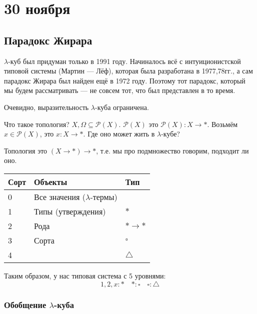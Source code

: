 \chapter{30 ноября}

\section{Парадокс Жирара}

\(\lambda\)-куб был придуман только в 1991 году. Начиналось всё с интуиционистской типовой системы (Мартин --- Лёф), которая была разработана в 1977,78гг., а сам парадокс Жирара был найден ещё в 1972 году. Поэтому тот парадокс, который мы будем рассматривать --- не совсем тот, что был представлен в то время.

Очевидно, выразительность \(\lambda\)-куба ограничена.

\begin{example}
    Что такое топология? \(X, \Omega \subseteq \mathcal{P}(X)\). \(\mathcal{P}(X)\) это \(\mathcal{P}(X): X \to *\). Возьмём \(x \in \mathcal{P}(X)\), это \(x : X \to *\). Где оно может жить в \(\lambda\)-кубе?

    Топология это \((X \to *) \to *\), т.е. мы про подмножество говорим, подходит ли оно.

    \begin{center}
        \begin{tabular}{lll}\toprule
            Сорт & Объекты                          & Тип           \\ \midrule
            0    & Все значения (\(\lambda\)-термы) &               \\
            1    & Типы (утверждения)               & \(*\)         \\
            2    & Рода                             & \(* \to *\)   \\
            3    & Сорта                            & \(\square\)   \\
            4    &                                  & \(\triangle\) \\
            \bottomrule
        \end{tabular}
    \end{center}

    Таким образом, у нас типовая система с 5 уровнями:
    \[1, 2, x : * \quad * : \square \quad \square : \triangle\]
\end{example}

\subsection{Обобщение \(\lambda\)-куба}

